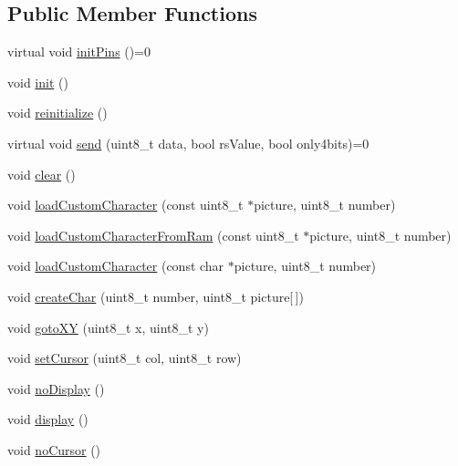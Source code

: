 \subsection*{Public Member Functions}
\begin{DoxyCompactItemize}
\item 
virtual void \hyperlink{class_pololu_h_d44780_base_a9c2a2e0dfb089a6c21aa12a6a5299750}{init\+Pins} ()=0
\item 
void \hyperlink{class_pololu_h_d44780_base_a1c2a3edc8cfecde7e6fd2a83c17c0e23}{init} ()
\item 
void \hyperlink{class_pololu_h_d44780_base_a10c1c42406708172fc38b718790ba881}{reinitialize} ()
\item 
virtual void \hyperlink{class_pololu_h_d44780_base_a004d5adb9e7c3cc546c6b0ed427dec7b}{send} (uint8\+\_\+t data, bool rs\+Value, bool only4bits)=0
\item 
void \hyperlink{class_pololu_h_d44780_base_a4d35e9a47ceef1a7582e180165e0eae1}{clear} ()
\item 
void \hyperlink{class_pololu_h_d44780_base_a73d331af44ec2e624aa0468ce13f64e4}{load\+Custom\+Character} (const uint8\+\_\+t $\ast$picture, uint8\+\_\+t number)
\item 
void \hyperlink{class_pololu_h_d44780_base_a72674b5466690b49b639ae2ec3e4983f}{load\+Custom\+Character\+From\+Ram} (const uint8\+\_\+t $\ast$picture, uint8\+\_\+t number)
\item 
void \hyperlink{class_pololu_h_d44780_base_a4f22d613433fce0e0c661a237ade9aeb}{load\+Custom\+Character} (const char $\ast$picture, uint8\+\_\+t number)
\item 
void \hyperlink{class_pololu_h_d44780_base_afd802cdc57783830acfe2415355d9f09}{create\+Char} (uint8\+\_\+t number, uint8\+\_\+t picture\mbox{[}$\,$\mbox{]})
\item 
void \hyperlink{class_pololu_h_d44780_base_a4886df8c888669cf71675072689ace9b}{goto\+XY} (uint8\+\_\+t x, uint8\+\_\+t y)
\item 
void \hyperlink{class_pololu_h_d44780_base_aeb3377822dc672398a991f06a00312c0}{set\+Cursor} (uint8\+\_\+t col, uint8\+\_\+t row)
\item 
void \hyperlink{class_pololu_h_d44780_base_abc2d4e126017565c2a0cf2aac67870a0}{no\+Display} ()
\item 
void \hyperlink{class_pololu_h_d44780_base_af5dd1e137bfe9310a418924b7483fcdf}{display} ()
\item 
void \hyperlink{class_pololu_h_d44780_base_ab40886cf0b563a1806bc9391d00b032d}{no\+Cursor} ()

\end{DoxyCompactItemize}
